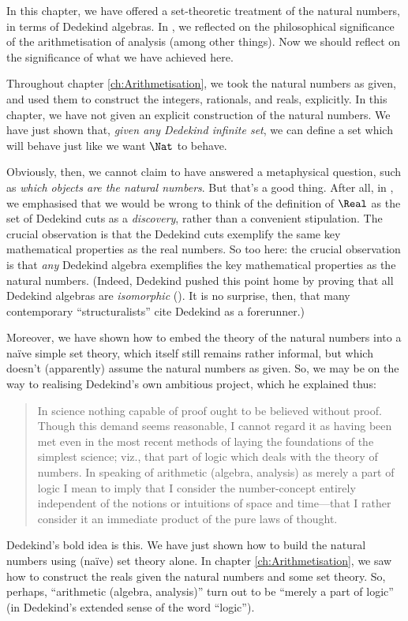 \documentclass[../../../include/open-logic-section]{subfiles}
\begin{document}
	
In this chapter, we have offered a set-theoretic treatment of the natural numbers, in terms of Dedekind algebras. In , we reflected on the philosophical significance of the arithmetisation of analysis (among other things). Now we should reflect on the significance of what we have achieved here.

Throughout chapter \ref{ch:Arithmetisation}, we took the natural numbers as given, and used them to construct the integers, rationals, and reals, explicitly. In this chapter, we have not given an explicit construction of the natural numbers. We have just shown that, \emph{given any Dedekind infinite set}, we can define a set which will behave just like we want $\Nat$ to behave. 

Obviously, then, we cannot claim to have answered a metaphysical question, such as \emph{which objects are the natural numbers}. But that's a good thing. After all, in  , we emphasised that we would be wrong to think of the definition of $\Real$ as the set of Dedekind cuts as a \emph{discovery}, rather than a convenient stipulation. The crucial observation is that the Dedekind cuts exemplify the same key mathematical properties as the real numbers. So too here: the crucial observation is that \emph{any} Dedekind algebra exemplifies the key mathematical properties as the natural numbers. (Indeed, Dedekind pushed this point home by proving that all Dedekind algebras are \emph{isomorphic} (\citeyear[Theorems 132--3]{Dedekind1888}). It is no surprise, then, that many contemporary ``structuralists'' cite Dedekind as a forerunner.)

 Moreover, we have shown how to embed the theory of the natural numbers into a na\"ive simple set theory, which itself still remains rather informal, but which doesn't (apparently) assume the natural numbers as given. So, we may be on the way to realising Dedekind's own ambitious project, which he explained thus:
\begin{quote}
	In science nothing capable of proof ought to be believed without proof. Though this demand seems reasonable, I cannot regard it as having been met even in the most recent methods of laying the foundations of the simplest science; viz., that part of logic which deals with the theory of numbers. In speaking of arithmetic (algebra, analysis) as merely a part of logic I mean to imply that I consider the number-concept entirely independent of the notions or intuitions of space and time---that I rather consider it an immediate product of the pure laws of thought. \citep[preface]{Dedekind1888}
\end{quote}
Dedekind's bold idea is this. We have just shown how to build the natural numbers using (na\"ive) set theory alone. In chapter \ref{ch:Arithmetisation}, we saw how to construct the reals given the natural numbers and some set theory. So, perhaps, ``arithmetic (algebra, analysis)'' turn out to be ``merely a part of logic'' (in Dedekind's extended sense of the word ``logic'').
\end{document}
